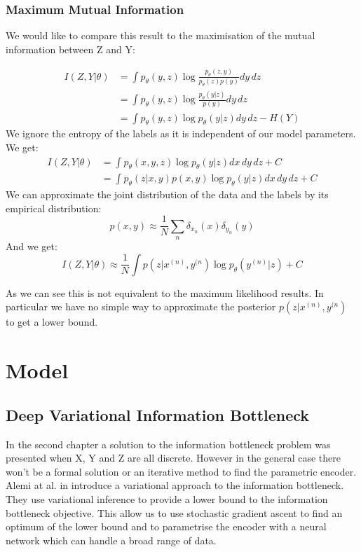 \documentclass[11pt,oneside,openright]{report}
\begin{document}
\subsection{Maximum Mutual Information}

We would like to compare this result to the maximisation of the  mutual information between Z and Y:

\begin{align}
I(Z, Y|\theta) &= \int p_\theta(y, z) \log \frac{p_\theta(z, y)}{p_\theta(z)p(y)} dy\,dz\\
& = \int p_\theta(y, z) \log \frac{p_\theta(y|z)}{p(y)} dy\,dz\\
&= \int p_\theta(y, z) \log p_\theta(y|z) dy\,dz - H(Y) 
\end{align}
We ignore the entropy of the labels as it is independent of our model parameters. We get:
\begin{align}
I(Z, Y|\theta) &= \int p_\theta(x, y, z) \log p_\theta(y| z) dx\,dy\,dz + C\\
&= \int p_\theta(z | x, y) p(x, y) \log p_\theta(y | z) dx\,dy\,dz + C
\end{align}
We can approximate the joint distribution of the data and the labels by its empirical distribution:
$$ p(x, y) \approx \frac{1}{N}\sum_n \delta_{x_n}(x) \delta_{y_n}(y)$$
And we get:
$$ I(Z, Y|\theta) \approx \frac{1}{N} \int p(z | x^{(n)}, y^{(n}) \log p_\theta(y^{(n)} | z) + C$$

As we can see this is not equivalent to the maximum likelihood results. In particular we have no simple way to approximate the posterior $p(z | x^{(n)}, y^{(n})$ to get a lower bound.


\chapter{Model}
\section{Deep Variational Information Bottleneck}

In the second chapter a solution to the information bottleneck problem was presented when X, Y and Z are all discrete. However in the general case there won't be a formal solution or an iterative method to find the parametric encoder. Alemi at al. in \cite{vib} introduce a variational approach to the information bottleneck. They use variational inference to provide a lower bound to the information bottleneck objective. This allow us to use stochastic gradient ascent to find an optimum of the lower bound and to parametrise the encoder with a neural network which can handle a broad range of data.
\end{document}
